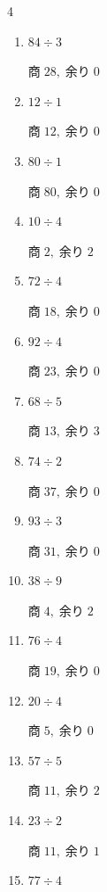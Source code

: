 \begin{multicols}{4}
\begin{enumerate}
        $商\; 9,\; 余り\; 1$

  \item $84 \div 3$

        $商\; 28,\; 余り\; 0$

  \item $12 \div 1$

        $商\; 12,\; 余り\; 0$

  \item $80 \div 1$

        $商\; 80,\; 余り\; 0$

  \item $10 \div 4$

        $商\; 2,\; 余り\; 2$

  \item $72 \div 4$

        $商\; 18,\; 余り\; 0$

  \item $92 \div 4$

        $商\; 23,\; 余り\; 0$

\columnbreak %

  \item $68 \div 5$

        $商\; 13,\; 余り\; 3$

  \item $74 \div 2$

        $商\; 37,\; 余り\; 0$

  \item $93 \div 3$

        $商\; 31,\; 余り\; 0$

  \item $38 \div 9$

        $商\; 4,\; 余り\; 2$

  \item $76 \div 4$

        $商\; 19,\; 余り\; 0$

  \item $20 \div 4$

        $商\; 5,\; 余り\; 0$

  \item $57 \div 5$

        $商\; 11,\; 余り\; 2$

  \item $23 \div 2$

        $商\; 11,\; 余り\; 1$

  \item $77 \div 4$


\end{enumerate}
\end{multicols}
